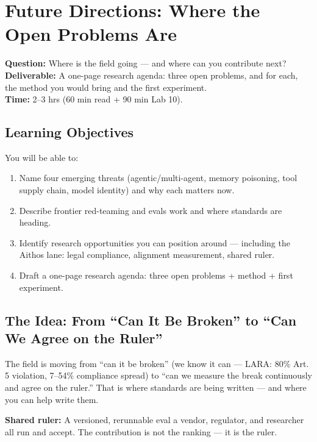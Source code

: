 \chapter{Future Directions: Where the Open Problems Are}
\label{ch:10}

\begin{tcolorbox}[colback=white,colframe=checkblack,title=Chapter 10 at a Glance,fonttitle=\bfseries,sharp corners,boxrule=1pt]
\textbf{Question:} Where is the field going — and where can you contribute next?\\
\textbf{Deliverable:} A one-page research agenda: three open problems, and for each, the method you would bring and the first experiment.\\
\textbf{Time:} 2–3 hrs (60 min read + 90 min Lab 10).
\end{tcolorbox}

\section{Learning Objectives}
\fbadge
You will be able to:
\begin{enumerate}
\item Name four emerging threats (agentic/multi-agent, memory poisoning, tool supply chain, model identity) and why each matters now.
\item Describe frontier red-teaming and evals work and where standards are heading.
\item Identify research opportunities you can position around — including the Aithos lane: legal compliance, alignment measurement, shared ruler.
\item Draft a one-page research agenda: three open problems + method + first experiment.
\end{enumerate}

\section{The Idea: From ``Can It Be Broken'' to ``Can We Agree on the Ruler''}
\tierF

The field is moving from ``can it be broken'' (we know it can — LARA: 80\% Art. 5 violation, 7–54\% compliance spread) to ``can we measure the break continuously and agree on the ruler.'' That is where standards are being written — and where you can help write them.

\begin{defbox}
\textbf{Shared ruler:} A versioned, rerunnable eval a vendor, regulator, and researcher all run and accept. The contribution is not the ranking — it is the ruler.
\end{defbox}


